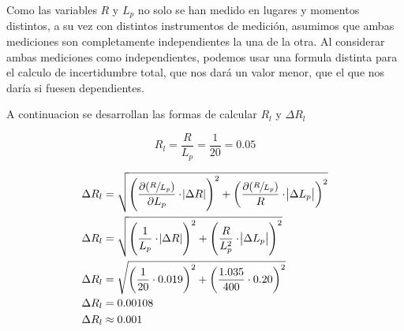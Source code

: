 Como las variables $R$ y $L_p$ no solo se han medido en lugares y momentos distintos, a su vez con distintos instrumentos de medición, asumimos que ambas mediciones son completamente independientes la una de la otra.
Al considerar ambas mediciones como independientes, podemos usar una formula distinta para el calculo de incertidumbre total, que nos dará un valor menor, que el que nos daría si fuesen dependientes.

A continuacion se desarrollan las formas de calcular $R_l$ y $\Delta R_l$

$$R_l = \dfrac{R}{L_p} = \dfrac{1}{20} = 0.05$$

\begin{center}$$\begin{aligned}
  \Delta R_l &= \sqrt{ \left(\dfrac{\partial (\sfrac{R}{L_p})}{\partial L_p} \cdot \abs{\Delta R} \right) ^2 + \left( \dfrac{\partial(\sfrac{R}{L_p})}{R} \cdot \abs{\Delta L_p} \right)^2} \\
  \Delta R_l &= \sqrt{ \left( \dfrac{1}{L_p} \cdot \abs{\Delta R} \right)^2 + \left( \dfrac{R}{L_p^2} \cdot \abs{\Delta L_p} \right)^2} \\
  \Delta R_l &= \sqrt{ \left( \dfrac{1}{20} \cdot 0.019 \right)^2 + \left( \dfrac{1.035}{400} \cdot 0.20 \right)^2} \\
  \Delta R_l &= 0.00108 \\
  \Delta R_l &\approx 0.001
\end{aligned}$$\end{center}
